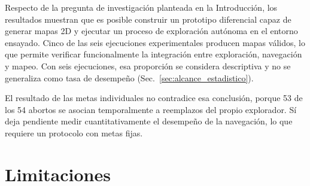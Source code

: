 Respecto de la pregunta de investigación planteada en la Introducción, los
resultados muestran que es posible construir un prototipo diferencial capaz de
generar mapas 2D y ejecutar un proceso de exploración autónoma en el entorno
ensayado. Cinco de las seis ejecuciones experimentales producen mapas válidos,
lo que permite verificar funcionalmente la integración entre exploración,
navegación y mapeo. Con seis ejecuciones, esa proporción se considera
descriptiva y no se generaliza como tasa de desempeño
(Sec.~\ref{sec:alcance_estadistico}).

El resultado de las metas individuales no contradice esa conclusión, porque 53
de los 54 abortos se asocian temporalmente a reemplazos del propio
explorador. Sí deja pendiente medir cuantitativamente el desempeño de la
navegación, lo que requiere un protocolo con metas fijas.

\section*{Limitaciones}
{}

